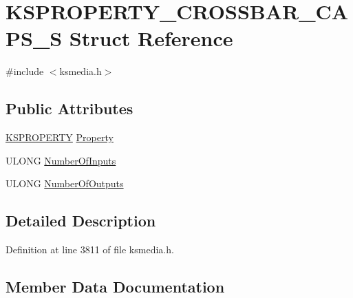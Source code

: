 \hypertarget{struct_k_s_p_r_o_p_e_r_t_y___c_r_o_s_s_b_a_r___c_a_p_s___s}{}\section{K\+S\+P\+R\+O\+P\+E\+R\+T\+Y\+\_\+\+C\+R\+O\+S\+S\+B\+A\+R\+\_\+\+C\+A\+P\+S\+\_\+S Struct Reference}
\label{struct_k_s_p_r_o_p_e_r_t_y___c_r_o_s_s_b_a_r___c_a_p_s___s}


{\ttfamily \#include $<$ksmedia.\+h$>$}

\subsection*{Public Attributes}
\begin{DoxyCompactItemize}
\item 
\hyperlink{ks_8h_a4392f77c74e868d813d46c39ada4d660}{K\+S\+P\+R\+O\+P\+E\+R\+TY} \hyperlink{struct_k_s_p_r_o_p_e_r_t_y___c_r_o_s_s_b_a_r___c_a_p_s___s_aafc90fdf4bf6efd5701a86bc31774fef}{Property}
\item 
U\+L\+O\+NG \hyperlink{struct_k_s_p_r_o_p_e_r_t_y___c_r_o_s_s_b_a_r___c_a_p_s___s_a8e4073299ce90e4f0532809879bed645}{Number\+Of\+Inputs}
\item 
U\+L\+O\+NG \hyperlink{struct_k_s_p_r_o_p_e_r_t_y___c_r_o_s_s_b_a_r___c_a_p_s___s_af43acd2f781df3a67c6fabfa9e8b1e35}{Number\+Of\+Outputs}
\end{DoxyCompactItemize}


\subsection{Detailed Description}


Definition at line 3811 of file ksmedia.\+h.



\subsection{Member Data Documentation}
